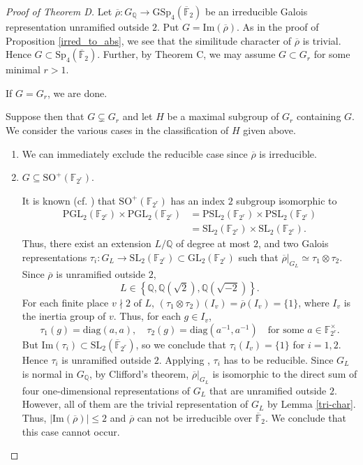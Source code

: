 \documentclass{amsart}
\theoremstyle{definition}
\newcommand{\lra}{\longrightarrow}
\newcommand{\Q}{\mathbb{Q}}
\newcommand{\F}{\mathbb{F}}
\newcommand{\bF}{\overline{\F}}
\newcommand{\diag}{\mathrm{diag}}
\newcommand{\br}{\overline{\rho}}
\newcommand{\GSp}{\mathrm{GSp}}
\newcommand{\Sp}{\mathrm{Sp}}
\newcommand{\GL}{\mathrm{GL}}
\newcommand{\SO}{\mathrm{SO}}
\newcommand{\PSL}{\mathrm{PSL}}
\newcommand{\PGL}{\mathrm{PGL}}
\newcommand{\SL}{\mathrm{SL}}
\newcommand{\im}{\mathrm{Im}}
\renewcommand{\le}{\leqslant}
\begin{document}
\begin{proof}[Proof of Theorem D]
  Let $\br:G_\Q\lra \GSp_4(\bF_2)$ be an irreducible Galois representation unramified outside $2$.
  Put $G=\im(\br)$. As in the proof of Proposition \ref{irred_to_abs},
  we see that the similitude character of $\br$ is trivial. Hence $G\subset \Sp_4(\bF_2)$.
  Further, by Theorem C, we may assume $G\subset G_r$ for some minimal $r>1$.

  If $G=G_r$, we are done.

  Suppose then that $G\subsetneq G_r$ and let $H$ be a maximal subgroup of $G_r$ containing $G$.
  We consider the various cases in the classification of $H$ given above.

  \begin{enumerate}
    \item We can immediately exclude the reducible case since $\br$ is irreducible.

    \item $G\subseteq \SO^+(\F_{2^r})$.

      It is known (cf. \cite[Section 7.2.2]{BHRD}) that $\SO^+(\F_{2^r})$ has an index $2$ subgroup isomorphic to
      \begin{align*}
        \PGL_2(\F_{2^r})\times \PGL_2(\F_{2^r}) & =\PSL_2(\F_{2^r})\times \PSL_2(\F_{2^r}) \\
                                                & =\SL_2(\F_{2^r})\times \SL_2(\F_{2^r}).
      \end{align*}
      Thus, there exist an extension $L/\Q$ of degree at most $2$, and two Galois representations $\tau_i:G_L \lra \SL_2(\F_{2^r})\subset \GL_2(\F_{2^r})$ such that $\br|_{G_L}\simeq \tau_1\otimes \tau_2$.
      Since $\br$ is unramified outside $2$,
      \begin{equation*}
        L\in\left\{\Q,\Q(\sqrt{2}),\Q(\sqrt{-2})\right\}.
      \end{equation*}
      For each finite place $v\nmid 2$ of $L$, $(\tau_1\otimes \tau_2)(I_v)=\br(I_v)=\{1\}$, where $I_v$ is the inertia group of $v$.
      Thus, for each $g\in I_v$,
      \begin{equation*}
        \tau_1(g)=\diag(a,a),\quad \tau_2(g)=\diag(a^{-1},a^{-1})\quad\text{for some }a\in \F^\times_{2^r}.
      \end{equation*}
      But $\im(\tau_i)\subset \SL_2(\bF_{2^r})$, so we conclude that
      $\tau_i(I_v)=\{1\}$ for $i=1,2$. Hence $\tau_i$ is unramified outside $2$.
      Applying \cite{MT}, $\tau_i$ has to be reducible. Since $G_L$ is normal in $G_\Q$,
      by Clifford's theorem, $\br|_{G_L}$ is isomorphic to the direct sum of four one-dimensional
      representations of $G_L$ that are unramified outside $2$. However, all of them are the trivial representation of $G_L$ by Lemma \ref{tri-char}. Thus, $|\im(\br)|\le 2$ and $\br$ can not be irreducible over $\bF_2$. We conclude that this case cannot occur.


\end{enumerate}
\end{proof}
\end{document}
